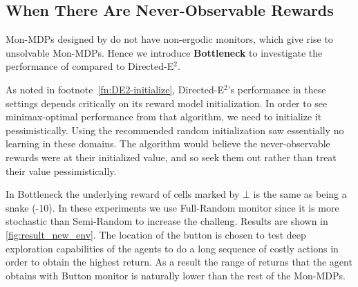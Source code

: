 \subsection{When There Are Never-Observable Rewards}
\label{appendix:never_obsrv}
Mon-MDPs designed by \citet{parisi2024beyond} do not have non-ergodic monitors, which give rise to unsolvable Mon-MDPs. Hence we introduce \textbf{Bottleneck} to investigate the performance of \thealgo compared to Directed-E$^2$. 

As noted in footnote~\ref{fn:DE2-initialize}, Directed-E$^2$'s performance in these settings depends critically on its reward model initialization.  In order to see minimax-optimal performance from that algorithm, we need to initialize it pessimistically.  Using the recommended random initialization saw essentially no learning in these domains.  The algorithm would believe the never-observable rewards were at their initialized value, and so seek them out rather than treat their value pessimistically.

In Bottleneck the underlying reward of cells marked by $\bot$ is the same as being a snake (-10). In these experiments we use Full-Random monitor since it is more stochastic than Semi-Random to increase the challeng. Results are shown in \cref{fig:result_new_env}. The location of the button is chosen to test deep exploration capabilities of the agents to do a long sequence of costly actions in order to obtain the highest return. As a result the range of returns that the agent obtains with Button monitor is naturally lower than the rest of the Mon-MDPs.

